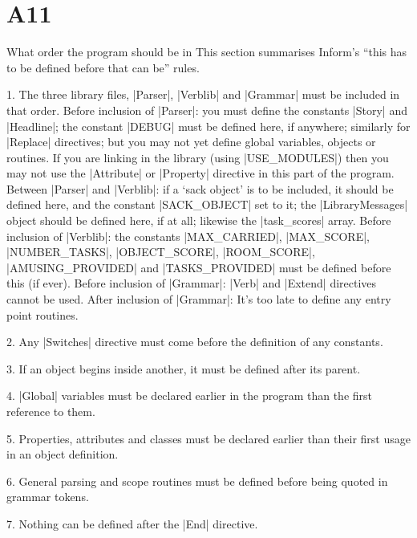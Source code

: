 \section{A11}{What order the program should be in}%
This section summarises Inform's ``this has to be defined before
that can be'' rules.
\smallskip
\item{1.} The three library files, |Parser|, |Verblib| and |Grammar| must be
included in that order.
\smallskip
{} Before inclusion of |Parser|: you must define the constants
|Story| and |Headline|; the constant |DEBUG| must be defined here, if
anywhere; similarly for |Replace| directives; but you may not yet define global
variables, objects or routines.  If you are linking in the library
(using |USE_MODULES|) then you may not use the |Attribute| or |Property|
directive in this part of the program.
 Between |Parser| and |Verblib|: if a `sack object' is
to be included, it should be defined here, and the constant |SACK_OBJECT|
set to it; the |LibraryMessages| object should be defined here, if at
all; likewise the |task_scores| array.
 Before inclusion of |Verblib|: the constants
\begindisplay
\qquad |MAX_CARRIED|, |MAX_SCORE|, |NUMBER_TASKS|, |OBJECT_SCORE|,\cr
\qquad |ROOM_SCORE|, |AMUSING_PROVIDED| and |TASKS_PROVIDED|\cr
\enddisplay
must be defined before this (if ever).
 Before inclusion of |Grammar|: |Verb| and |Extend| directives
cannot be used.
 After inclusion of |Grammar|: It's too late to define any
entry point routines.

\smallskip
\item{2.} Any |Switches| directive must come before the definition of any
constants.
\item{3.} If an object begins inside another, it must be defined after its
parent.
\item{4.} |Global| variables must be declared earlier in the
program than the first reference to them.
\item{5.} Properties, attributes and classes must be declared earlier than
their first usage in an object definition.
\item{6.} General parsing and scope routines must be defined before being quoted
in grammar tokens.
\item{7.} Nothing can be defined after the |End| directive.

\tenpoint

\vfill\eject\lexicontrue{}

\ninepoint

